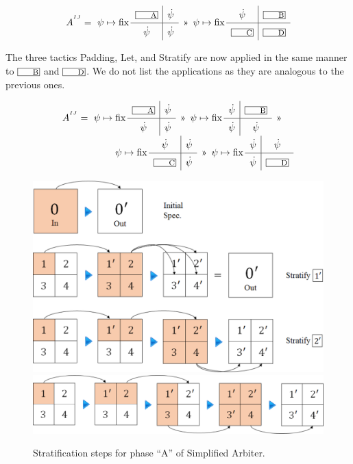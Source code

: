 \begin{center}
\end{center}

\begin{equation}
  A^{^{IJ}} =~ \psi\mapsto \fix \quadrants{\lbox A}{\dot\psi}{\dot\psi}{\dot\psi} ~\applt~ \psi\mapsto\fix\quadrants{\dot\psi}{\lbox B}{\lbox C}{\lbox D}
\end{equation}

The three tactics Padding, Let, and Stratify are now applied in the same manner to $\lbox B$
and $\lbox D$. We do not list the applications as they are analogous to the previous ones.

\begin{equation}
  \renewcommand\arraystretch{1.5}
  \begin{array}{l@{}l}
    A^{^{IJ}} =~ \psi\mapsto{} & \fix \quadrants{\lbox A}{\dot\psi}{\dot\psi}{\dot\psi} ~\applt~ 
                 \psi\mapsto\fix\quadrants{\dot\psi}{\lbox B}{\dot\psi}{\dot\psi} ~\applt \\
               & \psi\mapsto\fix\quadrants{\dot\psi}{\dot\psi}{\lbox C}{\dot\psi} ~\applt~
                 \psi\mapsto\fix\quadrants{\dot\psi}{\dot\psi}{\dot\psi}{\lbox D}
  \end{array}
\end{equation}

\begin{figure}
\includegraphics[width=.47\textwidth]{img/arbiter-stratify2}\\
\includegraphics[width=.47\textwidth]{img/arbiter-stratify3}
\caption{
  Stratification steps for phase ``A'' of Simplified Arbiter.}
\end{figure}

